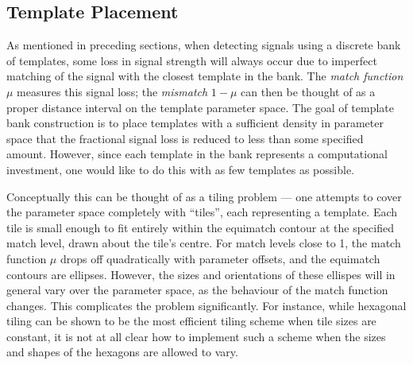 
\clearpage
\subsection{Template Placement}
\label{ss:placement}

As mentioned in preceding sections, when detecting signals using a
discrete bank of templates, some loss in signal strength will always
occur due to imperfect matching of the signal with the closest
template in the bank.  The \emph{match function} $\mu$ measures this
signal loss; the \emph{mismatch} $1-\mu$ can then be thought of as a
proper distance interval on the template parameter space.  The goal of
template bank construction is to place templates with a sufficient
density in parameter space that the fractional signal loss is reduced
to less than some specified amount.  However, since each template in
the bank represents a computational investment, one would like to do
this with as few templates as possible.

Conceptually this can be thought of as a tiling problem --- one
attempts to cover the parameter space completely with ``tiles'', each
representing a template.  Each tile is small enough to fit entirely
within the equimatch contour at the specified match level, drawn about
the tile's centre.  For match levels close to 1, the match function
$\mu$ drops off quadratically with parameter offsets, and the
equimatch contours are ellipses.  However, the sizes and orientations
of these ellispes will in general vary over the parameter space, as
the behaviour of the match function changes.  This complicates the
problem significantly.  For instance, while hexagonal tiling can be
shown to be the most efficient tiling scheme when tile sizes are
constant, it is not at all clear how to implement such a scheme when
the sizes and shapes of the hexagons are allowed to vary.

